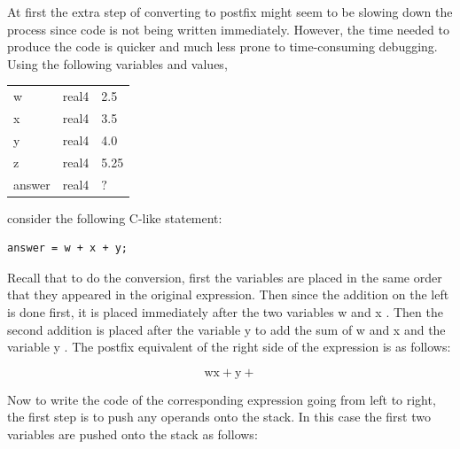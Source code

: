 \documentclass[10pt]{book}
\begin{document}
At first the extra step of converting to postfix might seem to be slowing down the process since code is not being written immediately. However, the time needed to produce the code is quicker and much less prone to time-consuming debugging. Using the following variables and values,

\begin{center}
\begin{tabular}{lll}
w & real4 & 2.5 \\
x & real4 & 3.5 \\
y & real4 & 4.0 \\
z & real4 & 5.25 \\
answer & real4 & $?$ \\
\end{tabular}
\end{center}

consider the following C-like statement:

\begin{verbatim}
answer = w + x + y;
\end{verbatim}

Recall that to do the conversion, first the variables are placed in the same order that they appeared in the original expression. Then since the addition on the left is done first, it is placed immediately after the two variables w and x . Then the second addition is placed after the variable y to add the sum of w and x and the variable y . The postfix equivalent of the right side of the expression is as follows:

$$
\mathrm{w} \mathrm{x}+\mathrm{y}+
$$

Now to write the code of the corresponding expression going from left to right, the first step is to push any operands onto the stack. In this case the first two variables are pushed onto the stack as follows:
\end{document}
